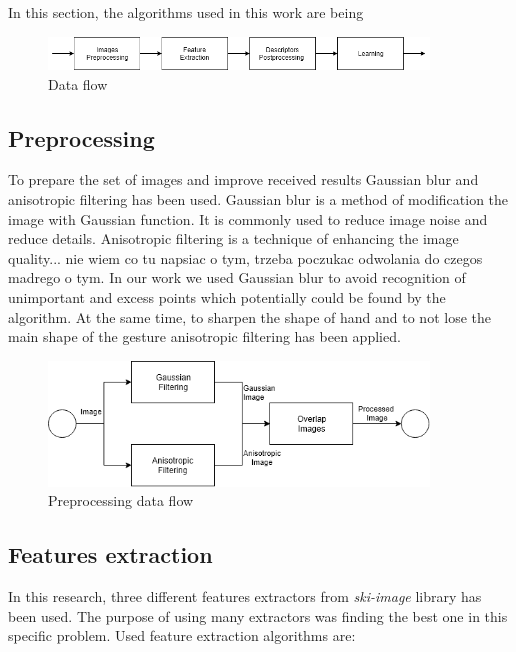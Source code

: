 \documentclass[11pt,a4paper]{article}
\begin{document}
	In this section, the algorithms used in this work are being
	\begin{figure}[H]
		\centering
		\includegraphics[width=0.9\textwidth]{Algorithm.png}
		\caption{Data flow}
		\label{fig:Algorithm}
	\end{figure} 

\subsection{Preprocessing}
	
	To prepare the set of images and improve received results Gaussian blur and anisotropic filtering has been used. Gaussian blur is a method of modification the image with Gaussian function. It is commonly used to reduce image noise and reduce details. Anisotropic filtering is a technique of enhancing the image quality... nie wiem co tu napsiac o tym, trzeba poczukac odwolania do czegos madrego o tym. In our work we used Gaussian blur to avoid recognition of unimportant and excess points which potentially could be found by the algorithm. At the same time, to sharpen the shape of hand and to not lose the main shape of the gesture anisotropic filtering has been applied.
	
	
	\begin{figure}[H]
		\centering
		\includegraphics[width=0.9\textwidth]{Preprocessing.png}
		\caption{Preprocessing data flow}
		\label{fig:Preprocessing}
	\end{figure}

\subsection{Features extraction}

In this research, three different features extractors from \textit{ski-image} library has been used. The purpose of using many extractors was finding the best one in this specific problem. Used feature extraction algorithms are:
\end{document}
